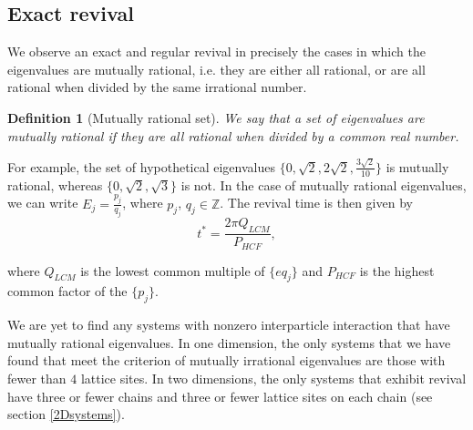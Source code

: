 \documentclass[a4paper, 10pt]{article}
\theoremstyle{plain}
\newtheorem{definition}[]{Definition}
\begin{document}
\subsection{Exact revival}

We observe an exact and regular revival in precisely the cases in which the
eigenvalues are mutually rational, i.e. they are either all rational, or are all
rational when divided by the same irrational number.
\begin{definition}[Mutually rational set]
    We say that a set of eigenvalues are mutually rational if they are all
    rational when divided by a common real number.
\end{definition}

For example, the set of
hypothetical eigenvalues $\lbrace 0, \sqrt{2}, 2 \sqrt{2}, \frac{3 \sqrt{2}}{10}
\rbrace$ is mutually rational, whereas $\lbrace 0, \sqrt{2}, \sqrt{3}\rbrace$ is
not. In the case of mutually rational eigenvalues, we can write $E_{j} =
\frac{p_{j}}{q_{j}}$, where $p_{j}$, $q_{j} \in \mathbb{Z}$. The revival time is
then given by
\begin{equation}
\label{revival_time_formula}
 t^* = \frac{2\pi Q_{LCM}}{P_{HCF}},
\end{equation}

where $Q_{LCM}$ is the
lowest common multiple of $\lbrace eq_j\rbrace$ and $P_{HCF}$ is the highest
common factor of the $\lbrace p_j \rbrace$.

We are yet to find any systems with nonzero interparticle interaction that have
mutually rational eigenvalues. In one dimension, the only systems that we have
found that meet the criterion of mutually irrational eigenvalues are those with
fewer than $4$ lattice sites. In two dimensions, the only systems that exhibit
revival have three or fewer chains and three or fewer lattice sites on each 
chain (see section \ref{2Dsystems}).
\end{document}
